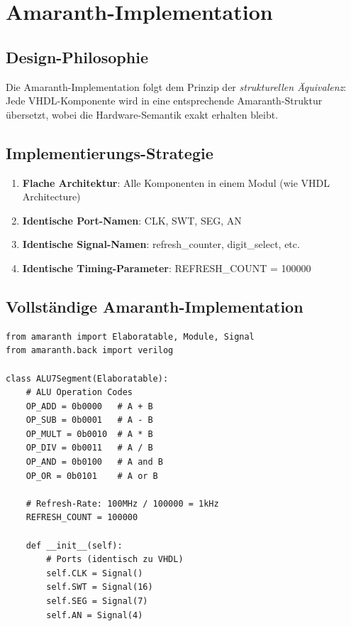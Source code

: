 ﻿\documentclass[12pt,a4paper]{report}
\begin{document}
\chapter{Amaranth-Implementation}

\section{Design-Philosophie}


Die Amaranth-Implementation folgt dem Prinzip der \textit{strukturellen Äquivalenz}: Jede VHDL-Komponente wird in eine entsprechende Amaranth-Struktur übersetzt, wobei die Hardware-Semantik exakt erhalten bleibt.

\section{Implementierungs-Strategie}

\begin{enumerate}
    \item \textbf{Flache Architektur}: Alle Komponenten in einem Modul (wie VHDL Architecture)
    \item \textbf{Identische Port-Namen}: CLK, SWT, SEG, AN
    \item \textbf{Identische Signal-Namen}: refresh\_counter, digit\_select, etc.
    \item \textbf{Identische Timing-Parameter}: REFRESH\_COUNT = 100000
\end{enumerate}

\section{Vollständige Amaranth-Implementation}

\begin{lstlisting}[style=pythonstyle, caption={Amaranth ALU-Implementation - Teil 1}]
from amaranth import Elaboratable, Module, Signal
from amaranth.back import verilog

class ALU7Segment(Elaboratable):
    # ALU Operation Codes
    OP_ADD = 0b0000   # A + B
    OP_SUB = 0b0001   # A - B
    OP_MULT = 0b0010  # A * B
    OP_DIV = 0b0011   # A / B
    OP_AND = 0b0100   # A and B
    OP_OR = 0b0101    # A or B
    
    # Refresh-Rate: 100MHz / 100000 = 1kHz
    REFRESH_COUNT = 100000
    
    def __init__(self):
        # Ports (identisch zu VHDL)
        self.CLK = Signal()
        self.SWT = Signal(16)
        self.SEG = Signal(7)
        self.AN = Signal(4)
\end{lstlisting}
\end{document}
